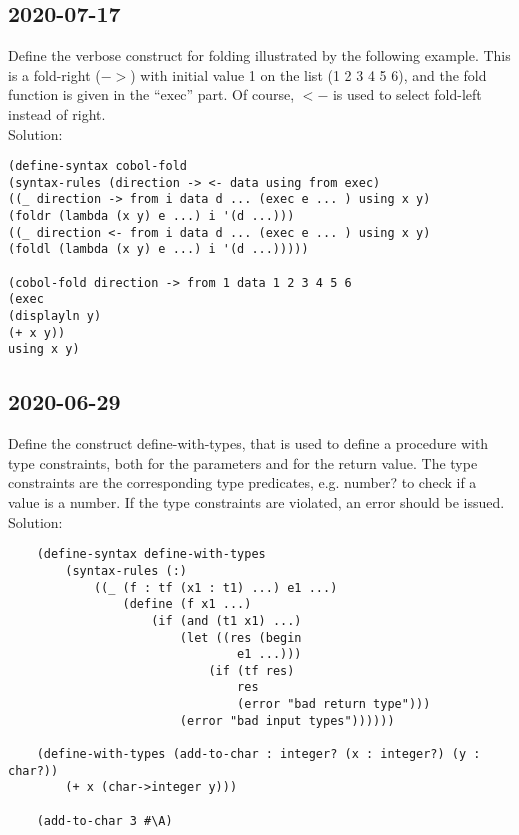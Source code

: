 \subsection{2020-07-17}
Define the verbose construct for folding illustrated by the following example.
This is a fold-right ($->$) with initial value 1 on the list (1 2 3 4 5 6),
and the fold function is given in the ``exec'' part.
Of course, $<-$ is used to select fold-left instead of right.\\
Solution:
\begin{lstlisting}
(define-syntax cobol-fold
(syntax-rules (direction -> <- data using from exec)
((_ direction -> from i data d ... (exec e ... ) using x y)
(foldr (lambda (x y) e ...) i '(d ...)))
((_ direction <- from i data d ... (exec e ... ) using x y)
(foldl (lambda (x y) e ...) i '(d ...)))))

(cobol-fold direction -> from 1 data 1 2 3 4 5 6
(exec
(displayln y)
(+ x y))
using x y)
\end{lstlisting}





\subsection{2020-06-29}
Define the construct define-with-types, that is used to define a procedure with type constraints, both for the parameters and for the return value.
The type constraints are the corresponding type predicates, e.g. number? to check if a value is a number.
If the type constraints are violated, an error should be issued.\\
Solution:
\begin{lstlisting}
	(define-syntax define-with-types
		(syntax-rules (:)
			((_ (f : tf (x1 : t1) ...) e1 ...)
				(define (f x1 ...)
					(if (and (t1 x1) ...)
						(let ((res (begin
								e1 ...)))
							(if (tf res)
								res
								(error "bad return type")))
						(error "bad input types"))))))
	
	(define-with-types (add-to-char : integer? (x : integer?) (y : char?))
		(+ x (char->integer y)))
	
	(add-to-char 3 #\A)
\end{lstlisting}





